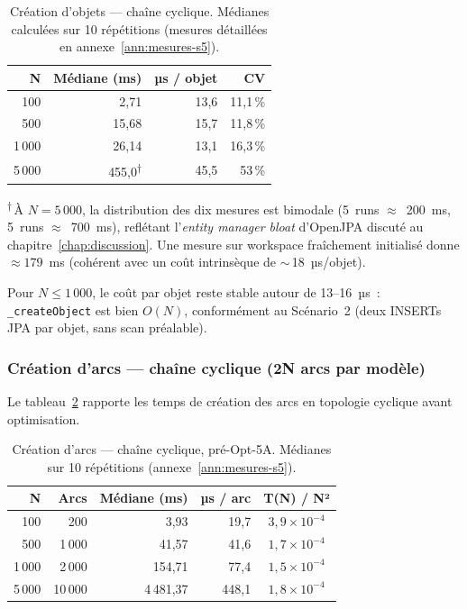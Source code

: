 \begin{table}[h]
\centering
\caption{Création d'objets --- chaîne cyclique. Médianes calculées sur
10 répétitions (mesures détaillées en annexe~\ref{ann:mesures-s5}).}
\label{tab:sc5-obj-cyclique}
\begin{tabular}{rrrr}
\hline
\textbf{N} & \textbf{Médiane (ms)} & \textbf{µs / objet} & \textbf{CV} \\
\hline
100    & 2,71   & 13,6 & 11,1\,\% \\
500    & 15,68  & 15,7 & 11,8\,\% \\
1\,000 & 26,14  & 13,1 & 16,3\,\% \\
5\,000 & 455,0\textsuperscript{$\dagger$} & 45,5 & 53\,\% \\
\hline
\end{tabular}
\end{table}

\textsuperscript{$\dagger$}\,À $N = 5\,000$, la distribution des dix
mesures est bimodale (5~runs $\approx$~200~ms, 5~runs $\approx$~700~ms),
reflétant l'\emph{entity manager bloat} d'OpenJPA discuté au
chapitre~\ref{chap:discussion}. Une mesure sur workspace fraîchement
initialisé donne $\approx 179$~ms (cohérent avec un coût intrinsèque de
$\sim$\,18~µs/objet).

Pour $N \leq 1\,000$, le coût par objet reste stable autour de
13--16~µs~: \texttt{\_createObject} est bien $O(N)$, conformément au
Scénario~2 (deux INSERTs JPA par objet, sans scan préalable).

\subsubsection{Création d'arcs — chaîne cyclique (2N arcs par modèle)}

Le tableau~\ref{tab:sc5-arc-cyclique} rapporte les temps de création
des arcs en topologie cyclique avant optimisation.

\begin{table}[h]
\centering
\caption{Création d'arcs --- chaîne cyclique, pré-Opt-5A. Médianes sur
10 répétitions (annexe~\ref{ann:mesures-s5}).}
\label{tab:sc5-arc-cyclique}
\begin{tabular}{rrrrc}
\hline
\textbf{N} & \textbf{Arcs} & \textbf{Médiane (ms)} & \textbf{µs / arc} & \textbf{T(N) / N²} \\
\hline
100   & 200     & 3,93       & 19,7  & $3{,}9 \times 10^{-4}$ \\
500   & 1\,000  & 41,57      & 41,6  & $1{,}7 \times 10^{-4}$ \\
1\,000 & 2\,000 & 154,71     & 77,4  & $1{,}5 \times 10^{-4}$ \\
5\,000 & 10\,000 & 4\,481,37 & 448,1 & $1{,}8 \times 10^{-4}$ \\
\hline
\end{tabular}
\end{table}

